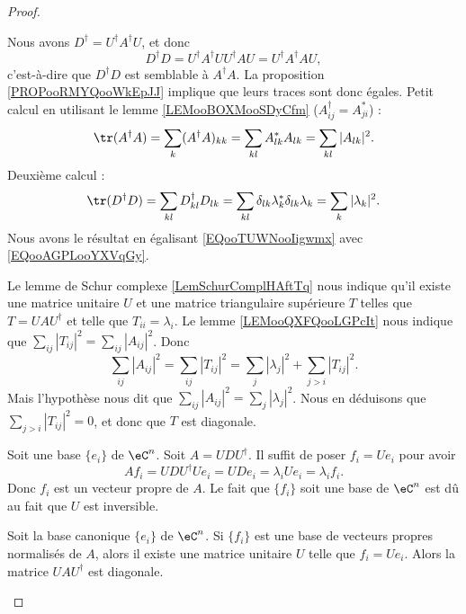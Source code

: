 \begin{proof}
\begin{subproof}
		Nous avons $D^{\dag}=U^{\dag}A^{\dag}U$, et donc
		\begin{equation}
			D^{\dag}D=U^{\dag}A^{\dag}UU^{\dag}AU=U^{\dag}A^{\dag}AU,
		\end{equation}
		c'est-à-dire que \( D^{\dag}D\) est semblable à \( A^{\dag}A\). La proposition \ref{PROPooRMYQooWkEpJJ} implique que leurs traces sont donc égales. Petit calcul en utilisant le lemme \ref{LEMooBOXMooSDyCfm} (\( A^{\dag}_{ij}=A_{ji}^*\)) :
		\begin{equation}    \label{EQooAGPLooYXVqGy}
			\tr(A^{\dag}A)=\sum_k(A^{\dag}A)_{kk}
			=\sum_{kl}A^*_{lk}A_{lk}
			=\sum_{kl}| A_{lk} |^2.
		\end{equation}
		Deuxième calcul :
		\begin{equation}        \label{EQooTUWNooIigwmx}
			\tr(D^{\dag}D)=\sum_{kl}D^{\dag}_{kl}D_{lk}=\sum_{kl}\delta_{lk}\lambda_k^*\delta_{lk}\lambda_k=\sum_{k}| \lambda_k |^2.
		\end{equation}
		Nous avons le résultat en égalisant \eqref{EQooTUWNooIigwmx} avec \eqref{EQooAGPLooYXVqGy}.

		\spitem[\ref{ITEMooIIQTooQORrXP} \( \Rightarrow\) \ref{ItemJZhFPSii}]
		Le lemme de Schur complexe \ref{LemSchurComplHAftTq} nous indique qu'il existe une matrice unitaire \( U\) et une matrice triangulaire supérieure \( T\) telles que \( T=UAU^{\dag}\) et telle que \( T_{ii}=\lambda_i\). Le lemme \ref{LEMooQXFQooLGPcIt} nous indique que \( \sum_{ij}| T_{ij} |^2=\sum_{ij}| A_{ij} |^2\). Donc
		\begin{equation}
			\sum_{ij}| A_{ij} |^2=\sum_{ij}| T_{ij} |^2=\sum_j| \lambda_j |^2+\sum_{j>i}| T_{ij} |^2.
		\end{equation}
		Mais l'hypothèse nous dit que \( \sum_{ij}| A_{ij} |^2=\sum_j| \lambda_j |^2\). Nous en déduisons que \( \sum_{j>i}| T_{ij} |^2=0\), et donc que \( T\) est diagonale.

		\spitem[\ref{ItemJZhFPSii}\( \Rightarrow\) \ref{ITEMooJRKSooNfsQJb}]
		Soit une base \( \{ e_i \}\) de \( \eC^n\). Soit \( A=UDU^{\dag}\). Il suffit de poser \( f_i=Ue_i\) pour avoir
		\begin{equation}
			Af_i=UDU^{\dag}Ue_i=UDe_i=\lambda_i Ue_i=\lambda_if_i.
		\end{equation}
		Donc \( f_i\) est un vecteur propre de \( A\). Le fait que \( \{ f_i \}\) soit une base de \( \eC^n\) est dû au fait que \( U\) est inversible.

		\spitem[\ref{ITEMooJRKSooNfsQJb} \( \Rightarrow\) \ref{ItemJZhFPSii}]
		Soit la base canonique \( \{ e_i \}\) de \( \eC^n\). Si \( \{ f_i \}\) est une base de vecteurs propres normalisés de \( A\), alors il existe une matrice unitaire \( U\) telle que \( f_i=Ue_i\). Alors la matrice \( UAU^{\dag}\) est diagonale.
	\end{subproof}
\end{proof}

